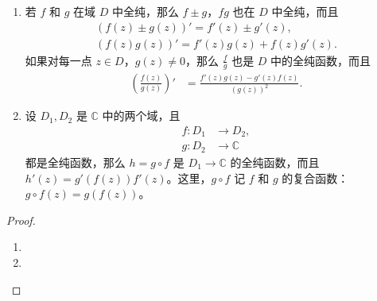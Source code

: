 \documentclass[../../main.tex]{subfiles}
\begin{document}
\begin{proposition}
\begin{enumerate}[(1)]
\item 若 \( f \) 和 \( g \) 在域 \( D \) 中全纯，那么 \( f \pm g \)，\( fg \) 也在 \( D \) 中全纯，而且
\begin{gather*}
(f(z) \pm g(z))' = f'(z) \pm g'(z), \\
(f(z)g(z))' = f'(z)g(z) + f(z)g'(z).
\end{gather*}
如果对每一点 \( z \in D \)，\( g(z) \neq 0 \)，那么 \( \frac{f}{g} \) 也是 \( D \) 中的全纯函数，而且
\begin{align*}
\left( \frac{f(z)}{g(z)} \right)' &= \frac{f'(z)g(z) - g'(z)f(z)}{(g(z))^2}.
\end{align*}

\item 设 \( D_1, D_2 \) 是 \( \mathbb{C} \) 中的两个域，且
\begin{align*}
f: D_1 &\to D_2, \\
g: D_2 &\to \mathbb{C}
\end{align*}
都是全纯函数，那么 \( h = g \circ f \) 是 \( D_1 \to \mathbb{C} \) 的全纯函数，而且 \( h'(z) = g'(f(z))f'(z) \)。这里，\( g \circ f \) 记 \( f \) 和 \( g \) 的复合函数：\( g \circ f(z) = g(f(z)) \)。
\end{enumerate}
\end{proposition}
\begin{proof}
\begin{enumerate}[(1)]
\item 

\item 
\end{enumerate}
\end{proof}
\end{document}
